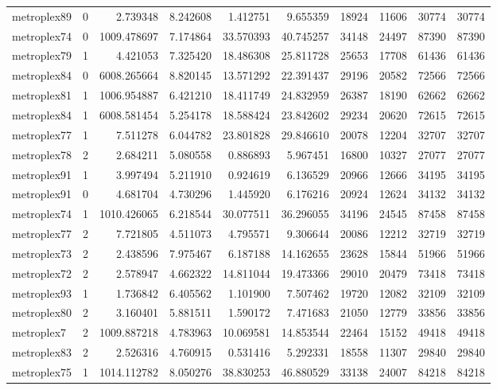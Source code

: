 \begin{longtable}{|l|r|r|r|r|r|r|r|r|r|}
metroplex89 & 0 & 2.739348 & 8.242608 & 1.412751 & 9.655359 & 18924 & 11606 & 30774 & 30774 \\
metroplex74 & 0 & 1009.478697 & 7.174864 & 33.570393 & 40.745257 & 34148 & 24497 & 87390 & 87390 \\
metroplex79 & 1 & 4.421053 & 7.325420 & 18.486308 & 25.811728 & 25653 & 17708 & 61436 & 61436 \\
metroplex84 & 0 & 6008.265664 & 8.820145 & 13.571292 & 22.391437 & 29196 & 20582 & 72566 & 72566 \\
metroplex81 & 1 & 1006.954887 & 6.421210 & 18.411749 & 24.832959 & 26387 & 18190 & 62662 & 62662 \\
metroplex84 & 1 & 6008.581454 & 5.254178 & 18.588424 & 23.842602 & 29234 & 20620 & 72615 & 72615 \\
metroplex77 & 1 & 7.511278 & 6.044782 & 23.801828 & 29.846610 & 20078 & 12204 & 32707 & 32707 \\
metroplex78 & 2 & 2.684211 & 5.080558 & 0.886893 & 5.967451 & 16800 & 10327 & 27077 & 27077 \\
metroplex91 & 1 & 3.997494 & 5.211910 & 0.924619 & 6.136529 & 20966 & 12666 & 34195 & 34195 \\
metroplex91 & 0 & 4.681704 & 4.730296 & 1.445920 & 6.176216 & 20924 & 12624 & 34132 & 34132 \\
metroplex74 & 1 & 1010.426065 & 6.218544 & 30.077511 & 36.296055 & 34196 & 24545 & 87458 & 87458 \\
metroplex77 & 2 & 7.721805 & 4.511073 & 4.795571 & 9.306644 & 20086 & 12212 & 32719 & 32719 \\
metroplex73 & 2 & 2.438596 & 7.975467 & 6.187188 & 14.162655 & 23628 & 15844 & 51966 & 51966 \\
metroplex72 & 2 & 2.578947 & 4.662322 & 14.811044 & 19.473366 & 29010 & 20479 & 73418 & 73418 \\
metroplex93 & 1 & 1.736842 & 6.405562 & 1.101900 & 7.507462 & 19720 & 12082 & 32109 & 32109 \\
metroplex80 & 2 & 3.160401 & 5.881511 & 1.590172 & 7.471683 & 21050 & 12779 & 33856 & 33856 \\
metroplex7 & 2 & 1009.887218 & 4.783963 & 10.069581 & 14.853544 & 22464 & 15152 & 49418 & 49418 \\
metroplex83 & 2 & 2.526316 & 4.760915 & 0.531416 & 5.292331 & 18558 & 11307 & 29840 & 29840 \\
metroplex75 & 1 & 1014.112782 & 8.050276 & 38.830253 & 46.880529 & 33138 & 24007 & 84218 & 84218 \\

\end{longtable}

